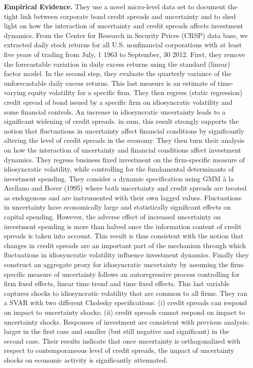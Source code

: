 \documentclass{article}
\begin{document}
{\textbf{Empirical Evidence.} They use a novel micro-level data set to document the tight link between corporate bond credit spreads and uncertainty and to shed light on how the interaction of uncertainty and credit spreads affects investment dynamics. From the Center for Research in Security Prices (CRSP) data base, we extracted daily stock returns for all U.S. nonfinancial corporations with at least five years of trading from July, 1 1963 to September, 30 2012. First, they remove the forecastable variation in daily excess returns using the standard (linear) factor model. In the second step, they evaluate the quarterly variance of the unforecastable daily excess returns. This last measure is an estimate of time-varying equity volatility for a specific firm. They then regress (static regression) credit spread of bond issued by a specific firm on idiosyncratic volatility and some financial controls. An increase in idiosyncratic uncertainty leads to a significant widening of credit spreads. in sum, this result strongly supports the notion that fluctuations in uncertainty affect financial conditions by significantly altering the level of credit spreads in the economy. They then turn their analysis on how the interaction of uncertainty and financial conditions affect investment dynamics. They regress business fixed investment on the firm-specific measure of idiosyncratic volatility, while controlling for the fundamental determinants of investment spending. They consider a dynamic specification using GMM \`a la Arellano and Bover (1995) where both uncertainty and credit spreads are treated as endogenous and are instrumented with their own lagged values. Fluctuations in uncertainty have economically large and statistically significant effects on capital spending. However, the adverse effect of increased uncertainty on investment spending is more than halved once the information content of credit spreads is taken into account. This result is thus consistent with the notion that changes in credit spreads are an important part of the mechanism through which fluctuations in idiosyncratic volatility influence investment dynamics. Finally they construct an aggregate proxy for idiosyncratic uncertainty by assuming the firm-specific measure of uncertainty follows an autoregressive process controlling for firm fixed effects, linear time trend and time fixed effects. This last variable captures shocks to idiosyncratic volatility that are common to all firms. They ran a SVAR with two different Cholesky specifications: (i) credit spreads can respond on impact to uncertainty shocks; (ii) credit spreads cannot respond on impact to uncertainty shocks. Responses of investment are consistent with previous analysis: larger in the first case and smaller (but still negative and significant) in the second case. Their results indicate that once uncertainty is orthogonalized with respect to contemporaneous level of credit spreads, the impact of uncertainty shocks on economic activity is significantly attenuated. 

}
\end{document}
